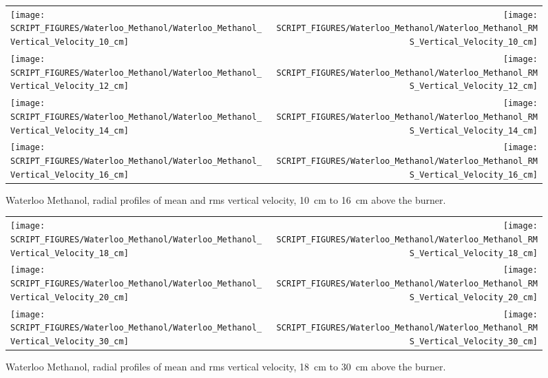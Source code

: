 \begin{figure}[p]
\begin{tabular*}{\textwidth}{l@{\extracolsep{\fill}}r}
\texttt{[image: SCRIPT\_FIGURES/Waterloo\_Methanol/Waterloo\_Methanol\_Vertical\_Velocity\_10\_cm]} &
\texttt{[image: SCRIPT\_FIGURES/Waterloo\_Methanol/Waterloo\_Methanol\_RMS\_Vertical\_Velocity\_10\_cm]} \\
\texttt{[image: SCRIPT\_FIGURES/Waterloo\_Methanol/Waterloo\_Methanol\_Vertical\_Velocity\_12\_cm]} &
\texttt{[image: SCRIPT\_FIGURES/Waterloo\_Methanol/Waterloo\_Methanol\_RMS\_Vertical\_Velocity\_12\_cm]} \\
\texttt{[image: SCRIPT\_FIGURES/Waterloo\_Methanol/Waterloo\_Methanol\_Vertical\_Velocity\_14\_cm]} &
\texttt{[image: SCRIPT\_FIGURES/Waterloo\_Methanol/Waterloo\_Methanol\_RMS\_Vertical\_Velocity\_14\_cm]} \\
\texttt{[image: SCRIPT\_FIGURES/Waterloo\_Methanol/Waterloo\_Methanol\_Vertical\_Velocity\_16\_cm]} &
\texttt{[image: SCRIPT\_FIGURES/Waterloo\_Methanol/Waterloo\_Methanol\_RMS\_Vertical\_Velocity\_16\_cm]}
\end{tabular*}
\caption[Waterloo Methanol, radial mean and rms vertical velocity, 10~cm to 16~cm above burner]
{Waterloo Methanol, radial profiles of mean and rms vertical velocity, 10~cm to 16~cm above the burner.}
\label{Water_Methanol_Vert_Vel_2}
\end{figure}

\begin{figure}[p]
\begin{tabular*}{\textwidth}{l@{\extracolsep{\fill}}r}
\texttt{[image: SCRIPT\_FIGURES/Waterloo\_Methanol/Waterloo\_Methanol\_Vertical\_Velocity\_18\_cm]} &
\texttt{[image: SCRIPT\_FIGURES/Waterloo\_Methanol/Waterloo\_Methanol\_RMS\_Vertical\_Velocity\_18\_cm]} \\
\texttt{[image: SCRIPT\_FIGURES/Waterloo\_Methanol/Waterloo\_Methanol\_Vertical\_Velocity\_20\_cm]} &
\texttt{[image: SCRIPT\_FIGURES/Waterloo\_Methanol/Waterloo\_Methanol\_RMS\_Vertical\_Velocity\_20\_cm]} \\
\texttt{[image: SCRIPT\_FIGURES/Waterloo\_Methanol/Waterloo\_Methanol\_Vertical\_Velocity\_30\_cm]} &
\texttt{[image: SCRIPT\_FIGURES/Waterloo\_Methanol/Waterloo\_Methanol\_RMS\_Vertical\_Velocity\_30\_cm]}
\end{tabular*}
\caption[Waterloo Methanol, radial mean and rms vertical velocity, 18~cm to 30~cm above burner]
{Waterloo Methanol, radial profiles of mean and rms vertical velocity, 18~cm to 30~cm above the burner.}
\label{Water_Methanol_Vert_Vel_3}
\end{figure}


